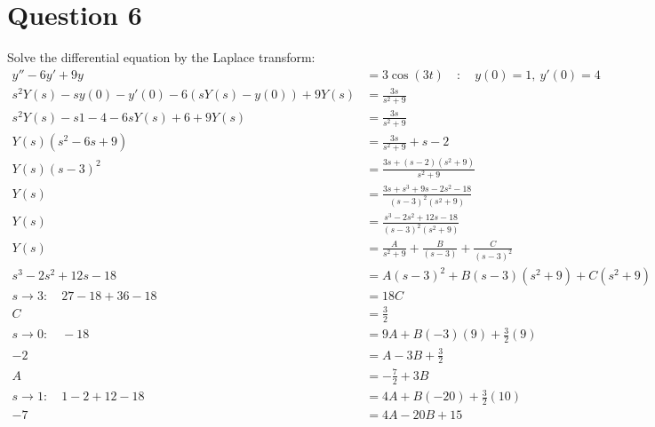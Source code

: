 \documentclass{article}
\begin{document}
\section*{Question 6}
Solve the differential equation by the Laplace transform:
\begin{align*}
    y''-6y'+9y                              & =3\cos{(3t)}\quad:\quad y(0)=1,\ y'(0)=4                       \\
    s^2Y(s)-sy(0)-y'(0)-6(sY(s)-y(0))+9Y(s) & = \frac{3s}{s^2+9}                                             \\
    s^2Y(s)-s1-4-6sY(s)+6+9Y(s)             & = \frac{3s}{s^2+9}                                             \\
    Y(s)(s^2-6s+9)                          & = \frac{3s}{s^2+9}+s-2                                         \\
    Y(s)(s-3)^2                             & = \frac{3s+(s-2)(s^2+9)}{s^2+9}                                \\
    Y(s)                                    & = \frac{3s+s^3+9s-2s^2-18}{(s-3)^2(s^2+9)}                     \\
    Y(s)                                    & = \frac{s^3-2s^2+12s-18}{(s-3)^2(s^2+9)}                       \\
    Y(s)                                    & = \frac{A}{s^2+9}+\frac{B}{(s-3)}+\frac{C}{(s-3)^2}            \\
    s^3-2s^2+12s-18                         & = A(s-3)^2+B(s-3)(s^2+9)+C(s^2+9)                              \\
    s\to3:\quad 27-18+36-18                 & = 18C                                                          \\
    C                                       & = \frac{3}{2}                                                  \\
    s\to0:\quad -18                         & =9A+B(-3)(9)+\frac{3}{2}(9)                                    \\
    -2                                      & =A-3B+\frac{3}{2}                                              \\
    A                                       & = -\frac{7}{2}+3B                                              \\
    s\to1:\quad 1-2+12-18                   & = 4A+B(-20)+\frac{3}{2}(10)                                    \\
    -7                                      & = 4A-20B+15                                                    \\

\end{align*}
\end{document}
